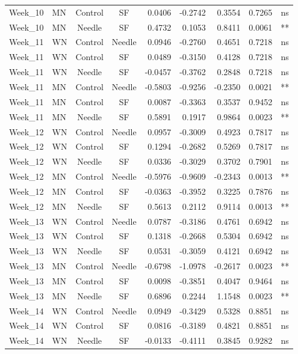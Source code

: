 \documentclass[
  12pt,
  letterpaper,
]{article}
\begin{document}
\begin{longtable}{llccrrrlc}
Week\_10 & MN & Control & SF & 0.0406 & -0.2742 & 0.3554 & 0.7265 & ns \\ 
Week\_10 & MN & Needle & SF & 0.4732 & 0.1053 & 0.8411 & 0.0061 & ** \\ 
Week\_11 & WN & Control & Needle & 0.0946 & -0.2760 & 0.4651 & 0.7218 & ns \\ 
Week\_11 & WN & Control & SF & 0.0489 & -0.3150 & 0.4128 & 0.7218 & ns \\ 
Week\_11 & WN & Needle & SF & -0.0457 & -0.3762 & 0.2848 & 0.7218 & ns \\ 
Week\_11 & MN & Control & Needle & -0.5803 & -0.9256 & -0.2350 & 0.0021 & ** \\ 
Week\_11 & MN & Control & SF & 0.0087 & -0.3363 & 0.3537 & 0.9452 & ns \\ 
Week\_11 & MN & Needle & SF & 0.5891 & 0.1917 & 0.9864 & 0.0023 & ** \\ 
Week\_12 & WN & Control & Needle & 0.0957 & -0.3009 & 0.4923 & 0.7817 & ns \\ 
Week\_12 & WN & Control & SF & 0.1294 & -0.2682 & 0.5269 & 0.7817 & ns \\ 
Week\_12 & WN & Needle & SF & 0.0336 & -0.3029 & 0.3702 & 0.7901 & ns \\ 
Week\_12 & MN & Control & Needle & -0.5976 & -0.9609 & -0.2343 & 0.0013 & ** \\ 
Week\_12 & MN & Control & SF & -0.0363 & -0.3952 & 0.3225 & 0.7876 & ns \\ 
Week\_12 & MN & Needle & SF & 0.5613 & 0.2112 & 0.9114 & 0.0013 & ** \\ 
Week\_13 & WN & Control & Needle & 0.0787 & -0.3186 & 0.4761 & 0.6942 & ns \\ 
Week\_13 & WN & Control & SF & 0.1318 & -0.2668 & 0.5304 & 0.6942 & ns \\ 
Week\_13 & WN & Needle & SF & 0.0531 & -0.3059 & 0.4121 & 0.6942 & ns \\ 
Week\_13 & MN & Control & Needle & -0.6798 & -1.0978 & -0.2617 & 0.0023 & ** \\ 
Week\_13 & MN & Control & SF & 0.0098 & -0.3851 & 0.4047 & 0.9464 & ns \\ 
Week\_13 & MN & Needle & SF & 0.6896 & 0.2244 & 1.1548 & 0.0023 & ** \\ 
Week\_14 & WN & Control & Needle & 0.0949 & -0.3429 & 0.5328 & 0.8851 & ns \\ 
Week\_14 & WN & Control & SF & 0.0816 & -0.3189 & 0.4821 & 0.8851 & ns \\ 
Week\_14 & WN & Needle & SF & -0.0133 & -0.4111 & 0.3845 & 0.9282 & ns \\ 

\end{longtable}
\end{document}
